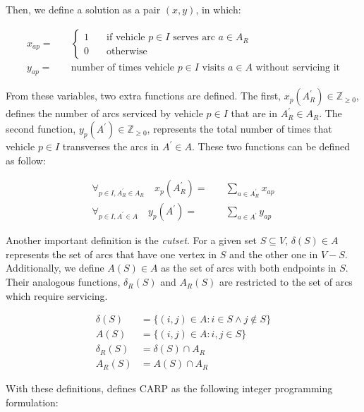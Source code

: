 Then, we define a solution as a pair $(x, y)$, in which:

\begin{align*}
x_{ap} = & \quad \left\{
	\begin{array}{ll}
		1 & \quad \mbox{if vehicle $p \in I$ serves arc $a \in A_R$} \\
		0 & \quad \mbox{otherwise}
	\end{array}
	\right. \\
y_{ap} = & \quad \mbox{number of times vehicle $p \in I$ visits $a \in A$ without servicing it}
\end{align*}

From these variables, two extra functions are defined. The first,
$x_p(A_R^\prime) \in \mathbb{Z}_{\geq0}$, defines the number of arcs serviced
by vehicle $p \in I$ that are in $A_R^\prime \in A_R$. The second function,
$y_p(A^\prime) \in \mathbb{Z}_{\geq0}$, represents the total number of times
that vehicle $p \in I$ transverses the arcs in $A^\prime \in A$. These two
functions can be defined as follow:

\begin{align}
	\forall_{p \in I, A_R^\prime \in A_R}	\quad x_p(A_R^\prime) = & \quad \sum_{a \in A_R^\prime} x_{ap} \\
	\forall_{p \in I, A^\prime \in A}	\quad y_p(A^\prime) =   & \quad \sum_{a \in A^\prime} y_{ap}
\end{align}

Another important definition is the \textit{cutset}. For a given set $S
\subseteq V$, $\delta(S) \in A$ represents the set of arcs that have one vertex
in $S$ and the other one in $V - S$. Additionally, we define $A(S) \in A$ as
the set of arcs with both endpoints in $S$. Their analogous functions,
$\delta_R(S)$ and $A_R(S)$ are restricted to the set of arcs which require
servicing.

\begin{align}
	\delta(S)	&= \{ (i, j) \in A : i \in S \wedge j \notin S \} \\
	A(S)		&= \{ (i, j) \in A : i,j \in S \} \\
	\delta_R(S)	&= \delta(S) \cap A_R \\
	A_R(S)		&= A(S) \cap A_R
\end{align}

With these definitions, \citet{Belenguer98} defines CARP as the following
integer programming formulation:

